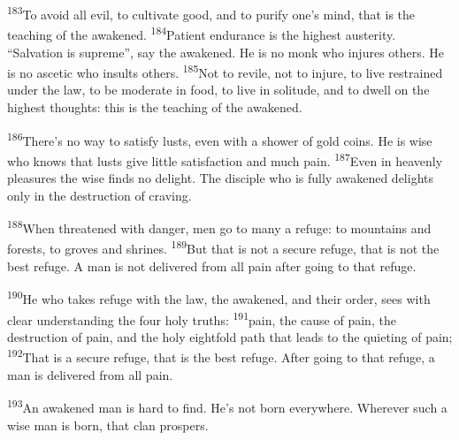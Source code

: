 \documentclass[openany,12pt,english]{book}
\newenvironment{para}{\par\pretolerance=100\tolerance=200\setlength{\emergencystretch}{0.6em}\relax}{\par}
\begin{document}
\begin{para}
    \textsuperscript{183}\thinspace{}To a\-void all evil, to cul\-ti\-vate good, and to pu\-ri\-fy one's mind, that is the teach\-ing of the awakened.
    \textsuperscript{184}\thinspace{}Pa\-tient en\-dur\-ance is the highest aus\-ter\-i\-ty. “Sal\-va\-tion is su\-preme”, say the awakened. He is no monk who injures others. He is no as\-cet\-ic who insults others.
    \textsuperscript{185}\thinspace{}Not to re\-vile, not to in\-jure, to live restrained un\-der the law, to be mod\-er\-ate in food, to live in sol\-i\-tude, and to dwell on the highest thoughts: this is the teach\-ing of the awakened.
\end{para}

\begin{para}
    \textsuperscript{186}\thinspace{}There's no way to sat\-is\-fy lusts, e\-ven with a show\-er of gold coins. He is wise who knows that lusts give lit\-tle sat\-is\-fac\-tion and much pain.
    \textsuperscript{187}\thinspace{}E\-ven in heav\-en\-ly pleasures the wise finds no de\-light. The dis\-ci\-ple who is ful\-ly awakened delights on\-ly in the de\-struc\-tion of crav\-ing.
\end{para}

\begin{para}
    \textsuperscript{188}\thinspace{}When threatened with dan\-ger, men go to man\-y a ref\-uge: to mountains and forests, to groves and shrines.
    \textsuperscript{189}\thinspace{}But that is not a se\-cure ref\-uge, that is not the best ref\-uge. A man is not delivered from all pain af\-ter go\-ing to that ref\-uge.
\end{para}

\begin{para}
    \textsuperscript{190}\thinspace{}He who takes ref\-uge with the law, the awakened, and their or\-der, sees with clear un\-der\-stand\-ing the four ho\-ly truths:
    \textsuperscript{191}\thinspace{}pain, the cause of pain, the de\-struc\-tion of pain, and the ho\-ly eight\-fold path that leads to the quieting of pain;
    \textsuperscript{192}\thinspace{}That is a se\-cure ref\-uge, that is the best ref\-uge. Af\-ter go\-ing to that ref\-uge, a man is delivered from all pain.
\end{para}

\begin{para}
    \textsuperscript{193}\thinspace{}An awakened man is hard to find. He's not born eve\-ry\-where. Wher\-ev\-er such a wise man is born, that clan prospers.
\end{para}
\end{document}
